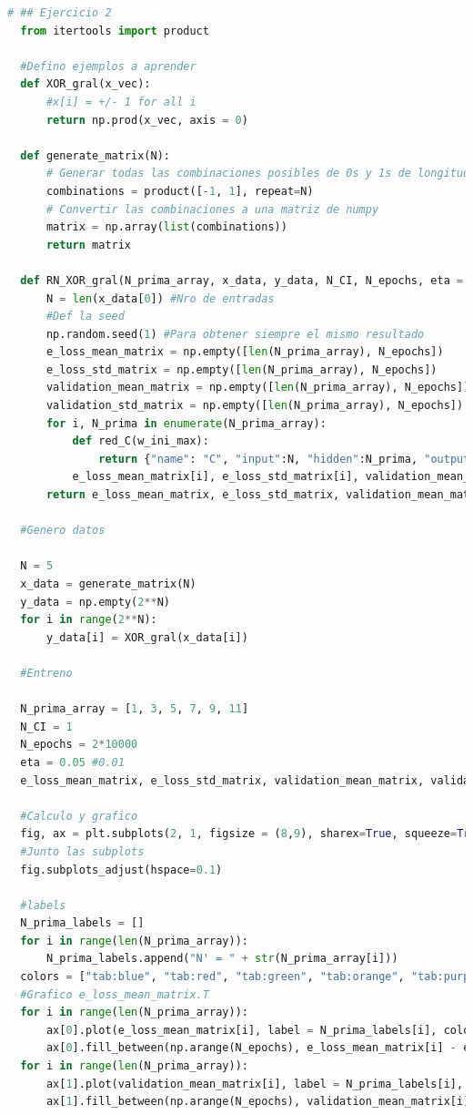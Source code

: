 \documentclass[aps,prb,twocolumn,superscriptaddress,floatfix,longbibliography]{revtex4-2}
\begin{document}
\begin{lstlisting}[language=Python]
  # ## Ejercicio 2
  from itertools import product
  
  #Defino ejemplos a aprender
  def XOR_gral(x_vec):
      #x[i] = +/- 1 for all i
      return np.prod(x_vec, axis = 0) 
  
  def generate_matrix(N):
      # Generar todas las combinaciones posibles de 0s y 1s de longitud N
      combinations = product([-1, 1], repeat=N)
      # Convertir las combinaciones a una matriz de numpy
      matrix = np.array(list(combinations))
      return matrix
  
  def RN_XOR_gral(N_prima_array, x_data, y_data, N_CI, N_epochs, eta = 0.1):
      N = len(x_data[0]) #Nro de entradas
      #Def la seed
      np.random.seed(1) #Para obtener siempre el mismo resultado
      e_loss_mean_matrix = np.empty([len(N_prima_array), N_epochs])
      e_loss_std_matrix = np.empty([len(N_prima_array), N_epochs])
      validation_mean_matrix = np.empty([len(N_prima_array), N_epochs])
      validation_std_matrix = np.empty([len(N_prima_array), N_epochs])
      for i, N_prima in enumerate(N_prima_array):
          def red_C(w_ini_max):
              return {"name": "C", "input":N, "hidden":N_prima, "output":1, "pesos":[np.random.rand(N+1,N_prima)*w_ini_max, np.random.rand(N_prima+1,1)*w_ini_max]}
          e_loss_mean_matrix[i], e_loss_std_matrix[i], validation_mean_matrix[i], validation_std_matrix[i], red_final = aprendizaje_redes(N_CI, N_epochs, red_C, x_data, y_data, eta = eta)
      return e_loss_mean_matrix, e_loss_std_matrix, validation_mean_matrix, validation_std_matrix
  
  #Genero datos
  
  N = 5
  x_data = generate_matrix(N)
  y_data = np.empty(2**N)
  for i in range(2**N):
      y_data[i] = XOR_gral(x_data[i])
  
  #Entreno
  
  N_prima_array = [1, 3, 5, 7, 9, 11]
  N_CI = 1
  N_epochs = 2*10000
  eta = 0.05 #0.01
  e_loss_mean_matrix, e_loss_std_matrix, validation_mean_matrix, validation_std_matrix = RN_XOR_gral(N_prima_array, x_data, y_data, N_CI, N_epochs, eta)
  
  #Calculo y grafico
  fig, ax = plt.subplots(2, 1, figsize = (8,9), sharex=True, squeeze=True)
  #Junto las subplots 
  fig.subplots_adjust(hspace=0.1)
  
  #labels
  N_prima_labels = []
  for i in range(len(N_prima_array)):
      N_prima_labels.append("N' = " + str(N_prima_array[i]))
  colors = ["tab:blue", "tab:red", "tab:green", "tab:orange", "tab:purple", "tab:brown"]
  #Grafico e_loss_mean_matrix.T
  for i in range(len(N_prima_array)):
      ax[0].plot(e_loss_mean_matrix[i], label = N_prima_labels[i], color = colors[i])
      ax[0].fill_between(np.arange(N_epochs), e_loss_mean_matrix[i] - e_loss_std_matrix[i], e_loss_mean_matrix[i] + e_loss_std_matrix[i], alpha = 0.2)
  for i in range(len(N_prima_array)):
      ax[1].plot(validation_mean_matrix[i], label = N_prima_labels[i], color = colors[i])
      ax[1].fill_between(np.arange(N_epochs), validation_mean_matrix[i] - validation_std_matrix[i], validation_mean_matrix[i] + validation_std_matrix[i], alpha = 0.2)
  

\end{lstlisting}
\end{document}
